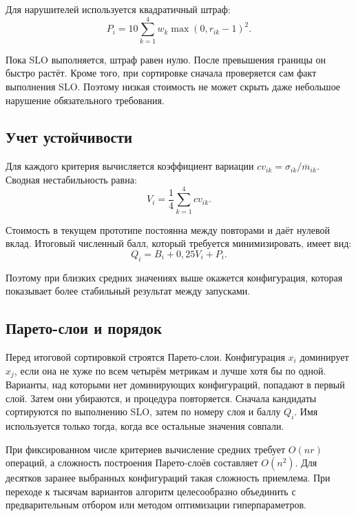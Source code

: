 \documentclass{misisarticle}
\begin{document}
	Для нарушителей используется квадратичный штраф:
\begin{equation}
 P_i=10\sum_{k=1}^{4}w_k\max(0,r_{ik}-1)^2.
 \label{eq:penalty}
\end{equation}

	Пока SLO выполняется, штраф равен нулю. После превышения границы он быстро растёт. Кроме того, при сортировке сначала проверяется сам факт выполнения SLO. Поэтому низкая стоимость не может скрыть даже небольшое нарушение обязательного требования.

\subsection{\textnormal{Учет устойчивости}}

	Для каждого критерия вычисляется коэффициент вариации $cv_{ik}=\sigma_{ik}/\overline m_{ik}$. Сводная нестабильность равна:
\begin{equation}
 V_i=\frac{1}{4}\sum_{k=1}^{4}cv_{ik}.
 \label{eq:variation}
\end{equation}

	Стоимость в текущем прототипе постоянна между повторами и даёт нулевой вклад. Итоговый численный балл, который требуется минимизировать, имеет вид:
\begin{equation}
 Q_i=B_i+0{,}25V_i+P_i.
 \label{eq:score}
\end{equation}

	Поэтому при близких средних значениях выше окажется конфигурация, которая показывает более стабильный результат между запусками.

\subsection{\textnormal{Парето-слои и порядок}}

	Перед итоговой сортировкой строятся Парето-слои. Конфигурация $x_i$ доминирует $x_j$, если она не хуже по всем четырём метрикам и лучше хотя бы по одной. Варианты, над которыми нет доминирующих конфигураций, попадают в первый слой. Затем они убираются, и процедура повторяется. Сначала кандидаты сортируются по выполнению SLO, затем по номеру слоя и баллу $Q_i$. Имя используется только тогда, когда все остальные значения совпали.

	При фиксированном числе критериев вычисление средних требует $O(nr)$ операций, а сложность построения Парето-слоёв составляет $O(n^2)$. Для десятков заранее выбранных конфигураций такая сложность приемлема. При переходе к тысячам вариантов алгоритм целесообразно объединить с предварительным отбором или методом оптимизации гиперпараметров.
\end{document}

